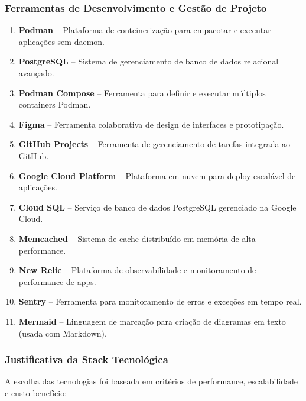 \documentclass[12pt, a4paper]{article}
\begin{document}
\begin{spacing}{1.5}
\subsubsection{Ferramentas de Desenvolvimento e Gestão de Projeto}
\begin{enumerate}[label=\alph*)]
\item \textbf{Podman} – Plataforma de conteinerização para empacotar e executar aplicações sem daemon.
\item \textbf{PostgreSQL} – Sistema de gerenciamento de banco de dados relacional avançado.
\item \textbf{Podman Compose} – Ferramenta para definir e executar múltiplos containers Podman.
\item \textbf{Figma} – Ferramenta colaborativa de design de interfaces e prototipação.
\item \textbf{GitHub Projects} – Ferramenta de gerenciamento de tarefas integrada ao GitHub.
\item \textbf{Google Cloud Platform} – Plataforma em nuvem para deploy escalável de aplicações.
\item \textbf{Cloud SQL} – Serviço de banco de dados PostgreSQL gerenciado na Google Cloud.
\item \textbf{Memcached} – Sistema de cache distribuído em memória de alta performance.
\item \textbf{New Relic} – Plataforma de observabilidade e monitoramento de performance de apps.
\item \textbf{Sentry} – Ferramenta para monitoramento de erros e exceções em tempo real.
\item \textbf{Mermaid} – Linguagem de marcação para criação de diagramas em texto (usada com Markdown).
\end{enumerate}

\subsubsection{Justificativa da Stack Tecnológica}
\begin{spacing}{1.5}
A escolha das tecnologias foi baseada em critérios de performance, escalabilidade e custo-benefício:


\end{spacing}
\end{spacing}
\end{document}

